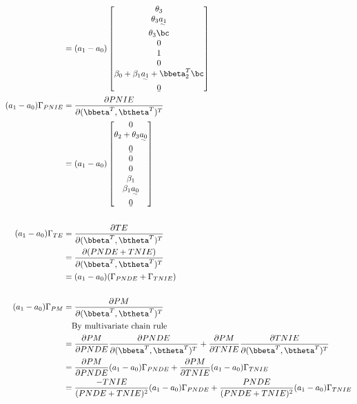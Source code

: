 \documentclass[dvipdfmx,10pt]{article}
\begin{document}
\begin{align*}
  &= (a_{1}-a_{0})
    \begin{bmatrix}
      \theta_{3}\\
      \theta_{3}\uwave{a_{1}}\\
      \theta_{3}\bc\\
      0\\
      1\\
      0\\
      \beta_{0} + \beta_{1}\uwave{a_{1}} + \bbeta_{2}^{T}\bc\\
      \b0\\
    \end{bmatrix}\\
  (a_{1}-a_{0})\Gamma_{PNIE}
  &= \frac{\partial PNIE}{\partial (\bbeta^{T},\btheta^{T})^{T}}\\
  &= (a_{1}-a_{0})
    \begin{bmatrix}
      0\\
      \theta_{2} + \theta_{3}\uwave{a_{0}}\\
      \b0\\
      0\\
      0\\
      \beta_{1}\\
      \beta_{1}\uwave{a_{0}}\\
      \b0\\
    \end{bmatrix}\\
  \\
  (a_{1}-a_{0})\Gamma_{TE}
  &= \frac{\partial TE}{\partial (\bbeta^{T},\btheta^{T})^{T}}\\
  &= \frac{\partial (PNDE+TNIE)}{\partial (\bbeta^{T},\btheta^{T})^{T}}\\
  &= (a_{1}-a_{0})(\Gamma_{PNDE} + \Gamma_{TNIE})\\
  \\
  (a_{1}-a_{0})\Gamma_{PM}
  &= \frac{\partial PM}{\partial (\bbeta^{T},\btheta^{T})^{T}}\\
  &~~~\text{By multivariate chain rule}\\
  &= \frac{\partial PM}{\partial PNDE}\frac{\partial PNDE}{\partial (\bbeta^{T},\btheta^{T})^{T}} + \frac{\partial PM}{\partial TNIE}\frac{\partial TNIE}{\partial (\bbeta^{T},\btheta^{T})^{T}}\\
  &= \frac{\partial PM}{\partial PNDE}(a_{1}-a_{0})\Gamma_{PNDE} + \frac{\partial PM}{\partial TNIE}(a_{1}-a_{0})\Gamma_{TNIE}\\
  &= \frac{-TNIE}{(PNDE+TNIE)^{2}}(a_{1}-a_{0})\Gamma_{PNDE} + \frac{PNDE}{(PNDE+TNIE)^{2}}(a_{1}-a_{0})\Gamma_{TNIE}\\

\end{align*}
\end{document}

